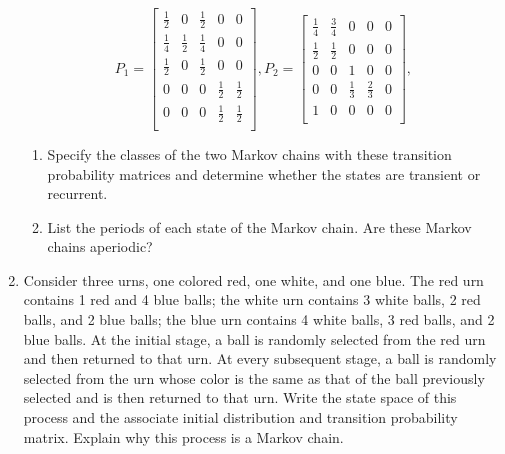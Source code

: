 \documentclass{article}
\begin{document}
\begin{enumerate}
\begin{equation*}
  P_1=
  \begin{bmatrix}
    \frac{1}{2} & 0   & \frac{1}{2}  & 0 & 0 \\
    \frac{1}{4} & \frac{1}{2}   & \frac{1}{4}  & 0 & 0\\
    \frac{1}{2} & 0  & \frac{1}{2}  & 0 & 0\\
    0 & 0   & 0  & \frac{1}{2} & \frac{1}{2}\\
    0 & 0   & 0  & \frac{1}{2} & \frac{1}{2}\\
  \end{bmatrix},
  P_2=
  \begin{bmatrix}
    \frac{1}{4} & \frac{3}{4}   & 0  & 0 & 0 \\
    \frac{1}{2} & \frac{1}{2}   & 0  & 0 & 0\\
    0 & 0  & 1  & 0 & 0\\
    0 & 0   & \frac{1}{3}  & \frac{2}{3} & 0\\
    1 & 0   & 0  & 0 & 0\\
  \end{bmatrix},
\end{equation*}
\begin{enumerate}
\item Specify the classes of the two Markov chains with these
  transition probability matrices and determine whether the states are
  transient or recurrent. %
\item List the periods of each state of the Markov chain. Are these Markov chains aperiodic? 
\end{enumerate}
\item Consider three urns, one colored red, one white, and one blue.
  The red urn contains 1 red and 4 blue balls; the white urn contains
  3 white balls, 2 red balls, and 2 blue balls; the blue urn contains
  4 white balls, 3 red balls, and 2 blue balls.  At the initial stage,
  a ball is randomly selected from the red urn and then returned to
  that urn. At every subsequent stage, a ball is randomly selected
  from the urn whose color is the same as that of the ball previously
  selected and is then returned to that urn. 
 Write the state space of this process and the associate initial
  distribution and transition probability matrix. Explain why this
  process is a Markov chain.
\end{enumerate}
\end{document}
